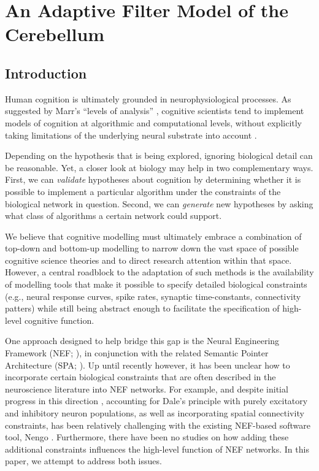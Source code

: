 \chapter{An Adaptive Filter Model of the Cerebellum}

\section{Introduction}
Human cognition is ultimately grounded in neurophysiological processes.
As suggested by Marr's \enquote{levels of analysis} \citep{marr1976understanding}, cognitive scientists tend to implement models of cognition at algorithmic and computational levels, without explicitly taking limitations of the underlying neural substrate into account \citep{eliasmith2015marr}.

Depending on the hypothesis that is being explored, ignoring biological detail can be reasonable. Yet, a closer look at biology may help in two complementary ways.
First, we can \emph{validate} hypotheses about cognition by determining whether it is possible to implement a particular algorithm under the constraints of the biological network in question.  
Second, we can \emph{generate} new hypotheses by asking what class of algorithms a certain network could support.

We believe that cognitive modelling must ultimately embrace a combination of top-down and bottom-up modelling to narrow down the vast space of possible cognitive science theories and to direct research attention within that space.
However, a central roadblock to the adaptation of such methods is the availability of modelling tools that make it possible to specify detailed biological constraints (e.g., neural response curves, spike rates, synaptic time-constants, connectivity patters) while still being abstract enough to facilitate the specification of high-level cognitive function.

One approach designed to help bridge this gap is the Neural Engineering Framework (NEF; \cite{eliasmith2003neural}), in conjunction with the related Semantic Pointer Architecture (SPA; \cite{eliasmith2013how}).
Up until recently however, it has been unclear how to incorporate certain biological constraints that are often described in the neuroscience literature into NEF networks.
For example, and despite initial progress in this direction \cite{parisien2008solving}, accounting for Dale's principle with purely excitatory and inhibitory neuron populations, as well as incorporating spatial connectivity constraints, has been relatively challenging with the existing NEF-based software tool, Nengo \cite{bekolay2014nengo}.
Furthermore, there have been no studies on how adding these additional constraints influences the high-level function of NEF networks. In this paper, we attempt to address both issues.

